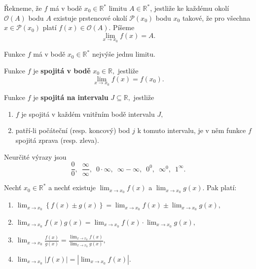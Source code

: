 \begin{definition}
Řekneme, že $f$ má v bodě $x_0\in \mathbb R^*$ limitu $A \in \mathbb R^*$,
jestliže ke každému okolí $\mathscr O(A)$ bodu $A$ existuje prstencové
okolí $\mathscr P(x_0)$ bodu $x_0$ takové, že pro všechna $x\in \mathscr P(x_0)$
platí $f(x)\in \mathscr O(A).$ Píšeme
$$
\lim_{x\to x_0}f(x)=A.
$$
\end{definition}

\begin{veta}
    Funkce $f$ má v bodě $x_0\in \mathbb R^*$ nejvýše jednu limitu.
\end{veta}

\begin{definition}
Funkce $f$ je \textbf{spojitá v bodě} $x_0\in \mathbb R,$ jestliže
$$\lim_{x\to x_0}f(x)=f(x_0).$$
\end{definition}

\begin{definition}
Funkce $f$ je \textbf{spojitá na intervalu} $J\subseteq \mathbb R,$ jestliže
\begin{enumerate}[$i.$]
\item $f$ je spojitá v každém vnitřním bodě intervalu $J,$
\item patří-li počáteční (resp. koncový) bod $j$ k tomuto intervalu,
je v něm funkce $f$ spojitá zprava (resp. zleva).
\end{enumerate}
\end{definition}

\begin{pozn}
Neurčité výrazy jsou
$$\frac{0}{0},  \,\,\, \frac{\infty}{\infty}, \,\,\, 0\cdot \infty, \,\,\, \infty - \infty, \,\,\,0^0,\,\,\, \infty^0,\,\,\, 1^\infty.$$
\end{pozn}

\begin{veta}
Nechť $x_0\in \mathbb R^*$ a nechť existuje $\lim_{x\to x_0}f(x)$ a $\lim_{x\to x_0}g(x)$.
Pak platí:
\begin{enumerate}[$i.$]
\item $\lim_{x\to x_0} \left \{ f(x)\pm g(x) \right \}= \lim_{x\to x_0}f(x) \pm \lim_{x\to x_0}g(x),$
\item $\lim_{x\to x_0}f(x)g(x)=\lim_{x\to x_0}f(x)\cdot \lim_{x\to x_0}g(x),$
\item $\lim_{x\to x_0}\frac{f(x)}{g(x)}=\frac{\lim_{x\to x_0}f(x)}{\lim_{x\to x_0}g(x)},$
\item $\lim_{x\to x_0}|f(x)| = |\lim_{x\to x_0}f(x)|.$
\end{enumerate}
\end{veta}

